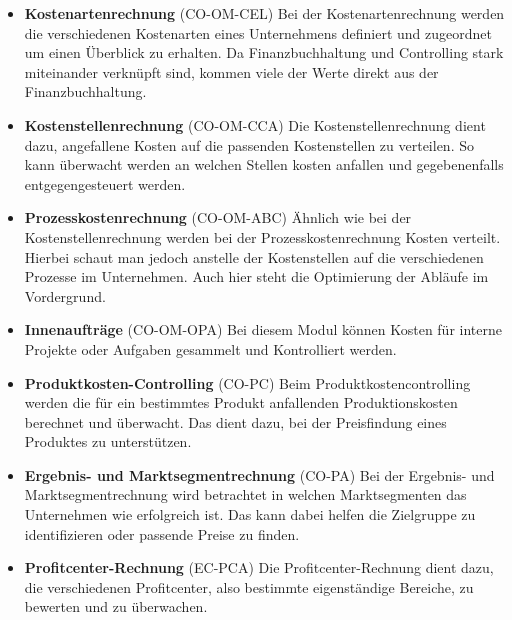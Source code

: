 \begin{itemize}
    \item \textbf{Kostenartenrechnung} (CO-OM-CEL) 
    Bei der Kostenartenrechnung werden die verschiedenen Kostenarten eines Unternehmens definiert und zugeordnet um einen Überblick zu erhalten.
    Da Finanzbuchhaltung und Controlling stark miteinander verknüpft sind, kommen viele der Werte direkt aus der Finanzbuchhaltung. \cite{ControllingSAP} \cite{Kostenartenrechnung}

    \item \textbf{Kostenstellenrechnung} (CO-OM-CCA)
    Die Kostenstellenrechnung dient dazu, angefallene Kosten auf die passenden Kostenstellen zu verteilen. So kann überwacht werden an welchen Stellen kosten anfallen 
    und gegebenenfalls entgegengesteuert werden. \cite{ControllingSAP}

    \item \textbf{Prozesskostenrechnung} (CO-OM-ABC)
    Ähnlich wie bei der Kostenstellenrechnung werden bei der Prozesskostenrechnung Kosten verteilt. Hierbei schaut man jedoch anstelle der Kostenstellen auf die verschiedenen Prozesse im Unternehmen.
    Auch hier steht die Optimierung der Abläufe im Vordergrund. \cite{ControllingSAP}

    \item \textbf{Innenaufträge} (CO-OM-OPA)
    Bei diesem Modul können Kosten für interne Projekte oder Aufgaben gesammelt und Kontrolliert werden.\cite{ControllingSAP} \cite{Innenauftrag}

    \item \textbf{Produktkosten-Controlling} (CO-PC)
    Beim Produktkostencontrolling werden die für ein bestimmtes Produkt anfallenden Produktionskosten berechnet und überwacht. Das dient dazu,
     bei der Preisfindung eines Produktes zu unterstützen. \cite{ControllingSAP}

    \item \textbf{Ergebnis- und Marktsegmentrechnung} (CO-PA)
    Bei der Ergebnis- und Marktsegmentrechnung wird betrachtet in welchen Marktsegmenten das Unternehmen wie erfolgreich ist. Das kann dabei helfen
     die Zielgruppe zu identifizieren oder passende Preise zu finden. \cite{ControllingSAP}

    \item \textbf{Profitcenter-Rechnung} (EC-PCA)
    Die Profitcenter-Rechnung dient dazu, die verschiedenen Profitcenter, also bestimmte eigenständige Bereiche, zu bewerten und zu überwachen. \cite{ControllingSAP}

\end{itemize}

